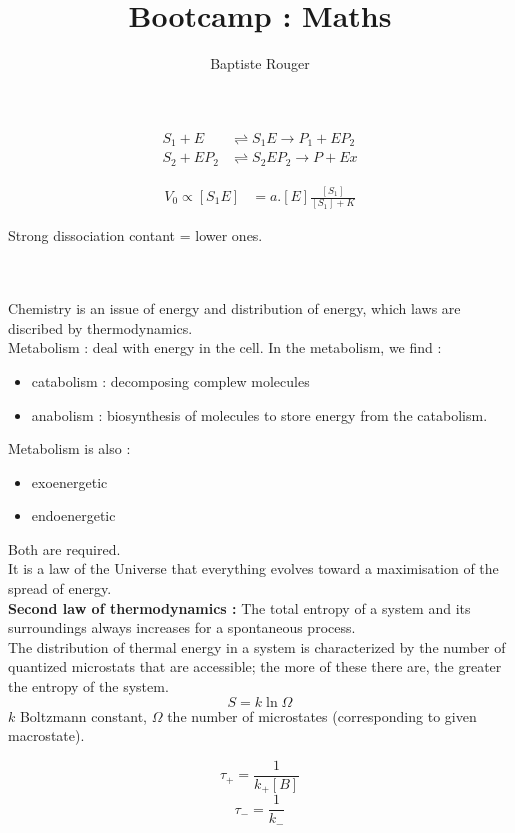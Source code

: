 \documentclass{article}
\title{Bootcamp : Maths}
\author{Baptiste Rouger}
\begin{document}
    \maketitle

    \tableofcontents

    \newpage

\begin{align*}
    S_1 + E &\rightleftharpoons  S_1E \rightarrow P_1 + EP_2 \\
    S_2 + EP_2 &\rightleftharpoons S_2EP_2 \rightarrow P + Ex
\end{align*}

\begin{align*}
    V_0 \propto [S_1E] &= a.[E]\frac{[S_1]}{[S_1]+K}
\end{align*}

Strong dissociation contant = lower ones.

~\\~\\

Chemistry is an issue of energy and distribution of energy, which laws are discribed by thermodynamics.\\

Metabolism : deal with energy in the cell. In the metabolism, we find :
\begin{itemize}
    \item catabolism : decomposing complew molecules
    \item anabolism : biosynthesis of molecules to store energy from the catabolism.
\end{itemize}

Metabolism is also :
\begin{itemize}
    \item exoenergetic
    \item endoenergetic
\end{itemize}
Both are required.\\

It is a law of the Universe that everything evolves toward a maximisation of the spread of energy.\\

\textbf{Second law of thermodynamics :} The total entropy of a system and its surroundings always increases for a spontaneous process.\\
The distribution of thermal energy in a system is characterized by the number of quantized microstats that are accessible; the more of these there are, the greater the entropy of the system.\\
\[ S = k \ln \Omega \]
 $k$ Boltzmann constant, $\Omega$ the number of microstates (corresponding to given macrostate).


 \[ \tau_+ = \frac{1}{k_+[B]} \]
 \[ \tau_- = \frac{1}{k_-} \]
\end{document}
